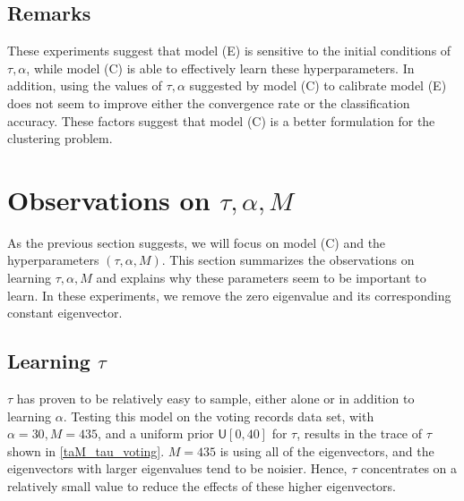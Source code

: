 \documentclass{siamart1116}
\begin{document}
    \subsection{Remarks}
        These experiments suggest that model (E) is sensitive to the initial conditions of $\tau, \alpha$, while model (C) is able to effectively learn these hyperparameters. In addition, using the values of $\tau, \alpha$ suggested by model (C) to calibrate model (E) does not seem to improve either the convergence rate or the classification accuracy. These factors suggest that model (C) is a better formulation for the clustering problem.

\section{Observations on $\tau, \alpha, M$}
    As the previous section suggests, we will focus on model (C) and the hyperparameters $(\tau,\alpha, M)$. This section summarizes the observations on learning $\tau, \alpha, M$ and explains why these parameters seem to be important to learn. In these experiments, we remove the zero eigenvalue and its corresponding constant eigenvector.




    \subsection{Learning $\tau$}
        $\tau$ has proven to be relatively easy to sample, either alone or in addition to learning $\alpha$. Testing this model on the voting records data set, with $\alpha = 30, M=435$, and a uniform prior $\mathsf{U}[0, 40]$ for $\tau$, results in the trace of $\tau$ shown in \cref{taM_tau_voting}. $M=435$ is using all of the eigenvectors, and the eigenvectors with larger eigenvalues tend to be noisier. Hence, $\tau$ concentrates on a relatively small value to reduce the effects of these higher eigenvectors.
\end{document}
